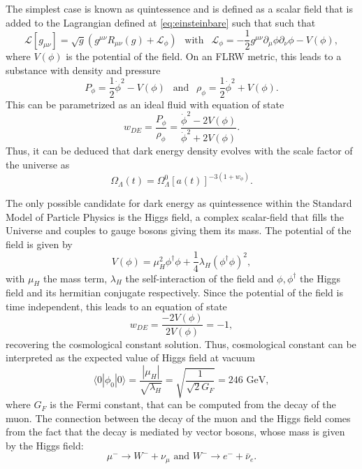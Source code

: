 The simplest case is known as quintessence and is defined as a scalar field that is added to the Lagrangian defined at \autoref{eq:einsteinbare} such that such that
\begin{equation}
\mathcal{L}[g_{\mu\nu}] = \sqrt{g}\left(g^{\mu\nu}R_{\mu\nu}(g)+\mathcal{L}_\phi\right)\ \ \mbox{ with }\ \ \mathcal{L}_\phi = -\frac{1}{2}g^{\mu\nu}\partial_\mu\phi\partial_\nu\phi-V(\phi),
\end{equation}
where $V(\phi)$ is the potential of the field. On an FLRW metric, this leads to a substance with density and pressure 
\begin{equation}
P_\phi = \frac{1}{2}\dot\phi^2-V(\phi)\ \ \mbox{ and }\ \ \rho_\phi=\frac{1}{2}\dot\phi^2+V(\phi).
\end{equation}
This can be parametrized as an ideal fluid with equation of state
\begin{equation}
w_{DE} = \frac{P_\phi}{\rho_\phi} = \frac{\dot\phi^2-2V(\phi)}{\dot\phi^2+2V(\phi)}.
\end{equation}
Thus, it can be deduced that dark energy density evolves with the scale factor of the universe as
\begin{equation}
\Omega_\Lambda(t) = \Omega_\Lambda^0 [a(t)]^{-3(1+w_\phi)}.
\end{equation}
\newline

The only possible candidate for dark energy as quintessence within the Standard Model of Particle Physics is the Higgs field, a complex scalar-field that fills the Universe and couples to gauge bosons giving them its mass. The potential of the field is given by
\begin{equation}
V(\phi) = \mu_H^2\phi^\dagger\phi+\frac{1}{4}\lambda_H(\phi^\dagger\phi)^2,
\end{equation}
with $\mu_H$ the mass term, $\lambda_H$ the self-interaction of the field and $\phi,\phi^\dagger$ the Higgs field and its hermitian conjugate respectively. Since the potential of the field is time independent, this leads to an equation of state
\begin{equation}
w_{DE} = \frac{-2V(\phi)}{2V(\phi)} = -1,
\end{equation}
recovering the cosmological constant solution. Thus, cosmological constant can be interpreted as the expected value of Higgs field at vacuum
\begin{equation}
\langle 0|\phi_0|0\rangle = \frac{|\mu_H|}{\sqrt{\lambda_H}}= \sqrt{\frac{1}{\sqrt{2}G_F}}= 246\mbox{ GeV},
\end{equation}
where $G_F$ is the Fermi constant, that can be computed from the decay of the muon. The connection between the decay of the muon and the Higgs field comes from the fact that the decay is mediated by vector bosons, whose mass is given by the Higgs field:
\begin{equation}
\mu^- \rightarrow W^- + \nu_\mu \mbox{ and }W^-\rightarrow e^-+\bar\nu_e.
\end{equation}
\newline


